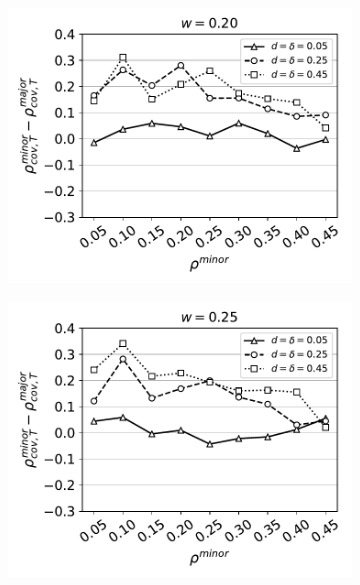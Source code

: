 \begin{figure}[H]
\begin{subfigure}{0.315\textwidth}
    \includegraphics[width=\textwidth]{Figures/full-minority-homophily=0p20.pdf}
  \end{subfigure}
  \begin{subfigure}{0.315\textwidth}
    \includegraphics[width=\textwidth]{Figures/full-minority-homophily=0p25.pdf}
  \end{subfigure}
  \\
  \begin{subfigure}{0.315\textwidth}

\end{subfigure}
\end{figure}
